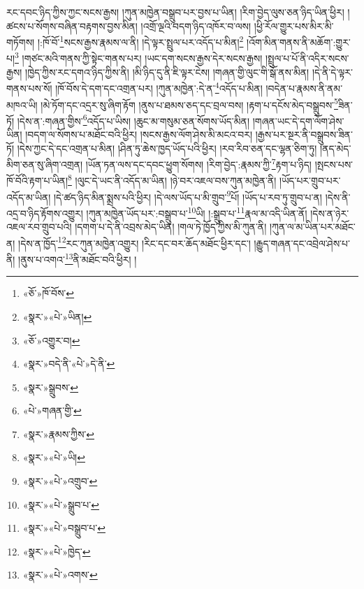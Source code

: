 རང་དབང་ཉིད་ཀྱིས་ཀྱང་སངས་རྒྱས། །ཀུན་མཁྱེན་བསྒྲུབ་པར་བྱས་པ་ཡིན། །རིག་བྱེད་ལུས་ཅན་ཉིད་ཡིན་ཕྱིར། །ཚངས་པ་སོགས་བཞིན་བརྟགས་བྱས་མིན། །འགྲོ་ལྔའི་བདག་ཉིད་འཁོར་བ་ལས། །ཕྱི་རོལ་གྱུར་པས་མིར་མི་གཏོགས། །:ཁོ་བོ་\footnote{«ཅོ་»ཁོ་བོས་}སངས་རྒྱས་རྣམས་ལ་ནི། །དེ་ལྟར་སྤྲུལ་པར་འདོད་པ་མིན།\footnote{«སྣར་»«པེ་»ཡིན།} །འོག་མིན་གནས་ནི་མཆོག་:གྱུར་པ།\footnote{«ཅོ་»འགྱུར་བ།} །གཙང་མའི་གནས་ཀྱི་སྟེང་གནས་པར། །ཡང་དག་སངས་རྒྱས་དེར་སངས་རྒྱས། །སྤྲུལ་པ་པོ་ནི་འདིར་སངས་རྒྱས། །ཁྱེད་ཀྱིས་རང་དགའ་ཉིད་ཀྱིས་ནི། །མི་ཉིད་དུ་ནི་ཇི་ལྟར་ངེས། །གཞན་གྱི་ལུང་གི་སྒོ་ནས་མིན། །དེ་ནི་དེ་ལྟར་གནས་པས་སོ། །ཁོ་བོས་དེ་དག་དང་འགྲན་པར། །ཀུན་མཁྱེན་:དེ་ན་\footnote{«སྣར་»བདེ་ནི་«པེ་»དེ་ནི་}འདོད་པ་མིན། །བདེན་པ་རྣམས་ནི་ནམ་མཁའ་ཡི། །མེ་ཏོག་དང་འདྲར་སུ་ཞིག་རྟོག །ནུས་པ་ཐམས་ཅད་དང་བྲལ་བས། །རྟག་པ་དངོས་མེད་བསྒྲུབས་\footnote{«སྣར་»སྒྲུབས་}ཟིན་ཏོ། །དེས་ན་:གཞན་གྱིས་\footnote{«པེ་»གཞན་གྱི་}འདོད་པ་ཡིས། །ཆུང་མ་གསུམ་ཅན་སོགས་ཡོད་མིན། །གཞན་ཡང་དེ་དག་ལོག་ཤེས་ཡིན། །བདག་ལ་སོགས་པ་མཐོང་བའི་ཕྱིར། །སངས་རྒྱས་ལོག་ཤེས་མི་མངའ་བར། །རྒྱས་པར་སྔར་ནི་བསྒྲུབས་ཟིན་ཏོ། །དེས་ཀྱང་དེ་དང་འགྲན་པ་མིན། །ཤིན་ཏུ་ཆེས་ཁྱད་ཡོད་པའི་ཕྱིར། །རབ་རིབ་ཅན་དང་ལྷན་ཅིག་ཏུ། །ནད་མེད་མིག་ཅན་སུ་ཞིག་འགྲན། །ཡོན་ཏན་ལས་དང་དབང་ཕྱུག་སོགས། །རིག་བྱེད་:རྣམས་ཀྱི་\footnote{«སྣར་»རྣམས་ཀྱིས་}རྟག་པ་ཉིད། །སྤངས་པས་ཁོ་བོའི་རྟག་པ་ཡིན།\footnote{«སྣར་»«པེ་»ཡི།} །ལུང་དེ་ཡང་ནི་འདོད་མ་ཡིན། །ཉེ་བར་འཇལ་བས་ཀུན་མཁྱེན་ནི། །ཡོད་པར་གྲུབ་པར་འདོད་མ་ཡིན། །དེ་ཚད་ཉིད་མིན་སྨྲས་པའི་ཕྱིར། །དེ་ལས་ཡོད་པ་མི་གྲུབ་\footnote{«སྣར་»«པེ་»འགྲུབ་}པོ། །ཡོད་པ་རབ་ཏུ་གྲུབ་པ་ན། །དེས་ནི་འདྲ་བ་ཉིད་རྟོགས་འགྱུར། །ཀུན་མཁྱེན་ཡོད་པར་:བསྒྲུབ་པ་\footnote{«སྣར་»«པེ་»སྒྲུབ་པ་}ཡི། །:སྒྲུབ་པ་\footnote{«སྣར་»«པེ་»བསྒྲུབ་པ་}རྣལ་མ་འདི་ཡིན་ནོ། །དེས་ན་ཉེར་འཇལ་རབ་གྲུབ་པའི། །དགག་པ་དེ་ནི་འབྲས་མེད་ཡིན། །གལ་ཏེ་ཁྱོད་ཀྱིས་མི་ཀུན་ནི། །ཀུན་ལ་མ་ཡིན་པར་མཐོང་ན། །དེས་ན་ཁྱོད་\footnote{«སྣར་»«པེ་»ཁྱེད་}རང་ཀུན་མཁྱེན་འགྱུར། །རིང་དང་བར་ཆོད་མཐོང་ཕྱིར་དང་། །རྒྱུད་གཞན་དང་འབྲེལ་ཤེས་པ་ནི། །ནུས་པ་འགའ་\footnote{«སྣར་»«པེ་»འགས་}ནི་མཐོང་བའི་ཕྱིར། །
